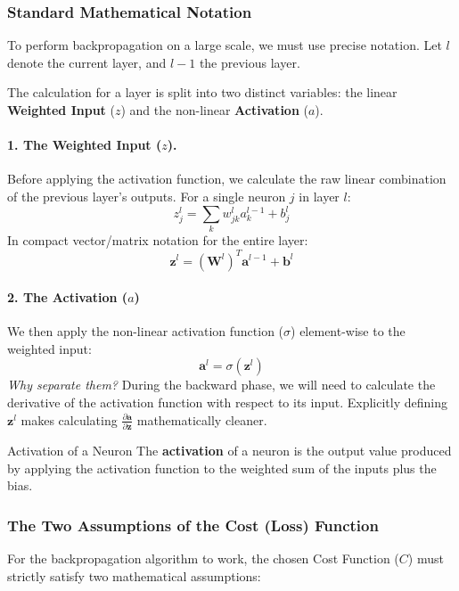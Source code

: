 \documentclass[11pt]{article}
\theoremstyle{smallexample}
\begin{document}
\subsubsection{Standard Mathematical Notation}
To perform backpropagation on a large scale, we must use precise notation. Let $l$ denote the current layer, and $l-1$ the previous layer. 

The calculation for a layer is split into two distinct variables: the linear \textbf{Weighted Input} ($z$) and the non-linear \textbf{Activation} ($a$).

\vspace{-0.2cm}
\paragraph*{1. The Weighted Input ($z$).}
Before applying the activation function, we calculate the raw linear combination of the previous layer's outputs. For a single neuron $j$ in layer $l$:
\begin{equation}
    z_j^l = \sum_k w_{jk}^{l} a_k^{l-1} + b_j^l
\end{equation}
In compact vector/matrix notation for the entire layer:
\begin{equation}
    \mathbf{z}^{l} = (\mathbf{W}^{l})^{T} \mathbf{a}^{l-1} + \mathbf{b}^{l}
\end{equation}

\vspace{-0.2cm}
\paragraph*{2. The Activation ($a$)}
We then apply the non-linear activation function ($\sigma$) element-wise to the weighted input:
\begin{equation}
    \mathbf{a}^{l} = \sigma(\mathbf{z}^{l})
\end{equation}
\textit{Why separate them?} During the backward phase, we will need to calculate the derivative of the activation function with respect to its input. Explicitly defining $\mathbf{z}^{l}$ makes calculating $\frac{\partial \mathbf{a}}{\partial \mathbf{z}}$ mathematically cleaner.

\begin{defbox}{Activation of a Neuron}
The \textbf{activation} of a neuron is the output value produced by applying the activation function to the weighted sum of the inputs plus the bias.
\end{defbox}

\subsubsection{The Two Assumptions of the Cost (Loss) Function}
For the backpropagation algorithm to work, the chosen Cost Function ($C$) must strictly satisfy two mathematical assumptions:
\end{document}
